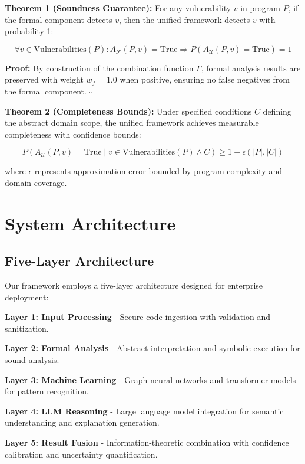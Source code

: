 \documentclass[conference,compsoc]{IEEEtran}
\begin{document}
\textbf{Theorem 1 (Soundness Guarantee):} For any vulnerability $v$ in program $P$, if the formal component detects $v$, then the unified framework detects $v$ with probability 1:

\begin{equation}
\forall v \in \text{Vulnerabilities}(P): A_{\mathcal{F}}(P, v) = \text{True} \Rightarrow P(A_{\mathcal{U}}(P, v) = \text{True}) = 1
\end{equation}

\textbf{Proof:} By construction of the combination function $\Gamma$, formal analysis results are preserved with weight $w_f = 1.0$ when positive, ensuring no false negatives from the formal component. $\square$

\textbf{Theorem 2 (Completeness Bounds):} Under specified conditions $C$ defining the abstract domain scope, the unified framework achieves measurable completeness with confidence bounds:

\begin{equation}
P(A_{\mathcal{U}}(P, v) = \text{True} \mid v \in \text{Vulnerabilities}(P) \wedge C) \geq 1 - \epsilon(|P|, |C|)
\end{equation}

where $\epsilon$ represents approximation error bounded by program complexity and domain coverage.

\section{System Architecture}

\subsection{Five-Layer Architecture}

Our framework employs a five-layer architecture designed for enterprise deployment:

\textbf{Layer 1: Input Processing} - Secure code ingestion with validation and sanitization.

\textbf{Layer 2: Formal Analysis} - Abstract interpretation and symbolic execution for sound analysis.

\textbf{Layer 3: Machine Learning} - Graph neural networks and transformer models for pattern recognition.

\textbf{Layer 4: LLM Reasoning} - Large language model integration for semantic understanding and explanation generation.

\textbf{Layer 5: Result Fusion} - Information-theoretic combination with confidence calibration and uncertainty quantification.
\end{document}
